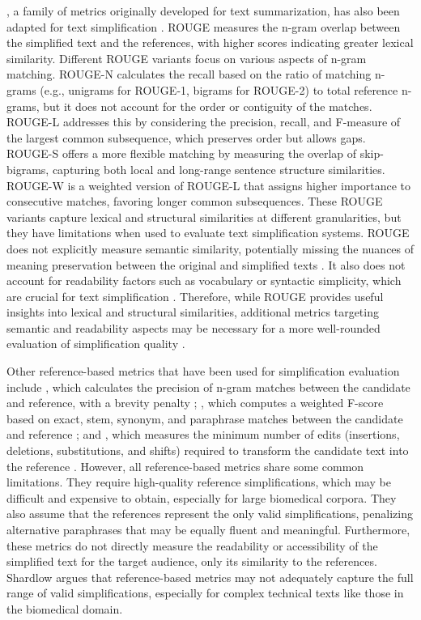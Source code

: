 , a family of metrics originally developed for text summarization, has also been adapted for text simplification \cite{xu-etal-2016-optimizing}.
ROUGE measures the n-gram overlap between the simplified text and the references, with higher scores indicating greater lexical similarity.
Different ROUGE variants focus on various aspects of n-gram matching.
ROUGE-N calculates the recall based on the ratio of matching n-grams (e.g., unigrams for ROUGE-1, bigrams for ROUGE-2) to total reference n-grams, but it does not account for the order or contiguity of the matches. 
ROUGE-L addresses this by considering the precision, recall, and F-measure of the largest common subsequence, which preserves order but allows gaps. 
ROUGE-S offers a more flexible matching by measuring the overlap of skip-bigrams, capturing both local and long-range sentence structure similarities. 
ROUGE-W is a weighted version of ROUGE-L that assigns higher importance to consecutive matches, favoring longer common subsequences.
These ROUGE variants capture lexical and structural similarities at different granularities, but they have limitations when used to evaluate text simplification systems. 
ROUGE does not explicitly measure semantic similarity, potentially missing the nuances of meaning preservation between the original and simplified texts \cite{xu2024reasoningcomparisonllmenhancedsemantic}.
It also does not account for readability factors such as vocabulary or syntactic simplicity, which are crucial for text simplification \cite{?}.
Therefore, while ROUGE provides useful insights into lexical and structural similarities, additional metrics targeting semantic and readability aspects may be necessary for a more well-rounded evaluation of simplification quality \cite{li2024largelanguagemodelsbiomedical}.

Other reference-based metrics that have been used for simplification evaluation include , which calculates the precision of n-gram matches between the candidate and reference, with a brevity penalty \cite{papineni-etal-2002-bleu}; , which computes a weighted F-score based on exact, stem, synonym, and paraphrase matches between the candidate and reference \cite{banerjee-lavie-2005-meteor}; and , which measures the minimum number of edits (insertions, deletions, substitutions, and shifts) required to transform the candidate text into the reference \cite{snover-etal-2006-study}.
However, all reference-based metrics share some common limitations. 
They require high-quality reference simplifications, which may be difficult and expensive to obtain, especially for large biomedical corpora. 
They also assume that the references represent the only valid simplifications, penalizing alternative paraphrases that may be equally fluent and meaningful. 
Furthermore, these metrics do not directly measure the readability or accessibility of the simplified text for the target audience, only its similarity to the references. 
Shardlow \cite{Shardlow2014} argues that reference-based metrics may not adequately capture the full range of valid simplifications, especially for complex technical texts like those in the biomedical domain.

